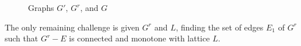 \begin{figure}
\hfill
\subfigure[\ensuremath{G'}]{\label{fig:erm1}}\hfill 
\subfigure[\ensuremath{G^r}]{\label{fig:erm2}}\hfill 
\subfigure[\ensuremath{G}]{\label{fig:erm3}}\hfill 
\caption{Graphs \ensuremath{G'}, \ensuremath{G^r}, and \ensuremath{G}}
\end{figure}

The only remaining challenge is given \(G^r\) and \(L\), 
finding the set of edges \(E_1\) of \(G^r\) such that 
\(G^r - E\) is connected and monotone with lattice \(L\)\@.
